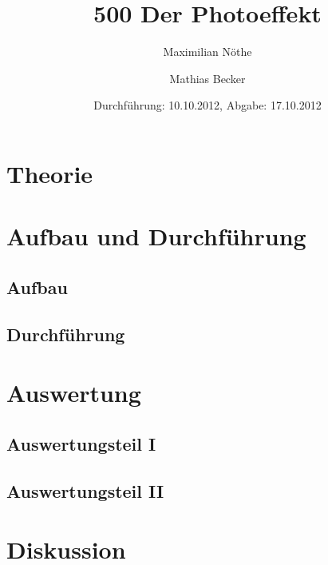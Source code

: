 \documentclass[
  titlepage=firstiscover,
]{scrartcl}
\title{500 Der Photoeffekt}
\author{Maximilian Nöthe \and Mathias Becker}
\date{Durchführung: 10.10.2012, Abgabe: 17.10.2012}
\begin{document}
\maketitle
\tableofcontents
\newpage

\section{Theorie}

\section{Aufbau und Durchführung}

\subsection{Aufbau}
\subsection{Durchführung}

\section{Auswertung}

\subsection{Auswertungsteil I}
\subsection{Auswertungsteil II}

\section{Diskussion}
\end{document}
